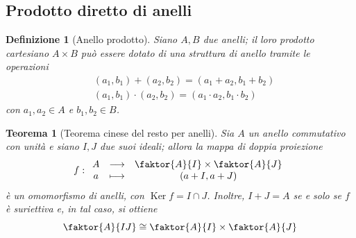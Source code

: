 \documentclass[12pt]{scrartcl}
\theoremstyle{style}
\newtheorem{definizione}{Definizione}[section]
\newtheorem{teorema}{Teorema}[section]
\numberwithin{equation}{subsection}
\begin{document}
\subsection{Prodotto diretto di anelli}
\begin{definizione}
	[Anello prodotto]
	Siano $A,B$ due anelli; il loro prodotto cartesiano $A\times B$ pu\`o essere dotato di una struttura di anello tramite le operazioni
	\[
	\begin{split}
		&(a_1,b_1)+(a_2,b_2) = (a_1+a_2,b_1+b_2) \\
		& (a_1,b_1) \cdot (a_2,b_2) = (a_1\cdot a_2, b_1\cdot b_2)
	\end{split}
	\] 
	con $a_1,a_2\in A$ e $b_1,b_2 \in B$.
\end{definizione}
\begin{teorema}
	[Teorema cinese del resto per anelli]
	Sia $A$ un anello commutativo con unit\`a e siano $I,J$ due suoi ideali; allora la mappa di doppia proiezione
	\[
	f :
	\begin{array}
		{c c c}
		A&\longrightarrow & \faktor{A}{I} \times \faktor{A}{J}\\
		a&\longmapsto &(a+I,a+J)
	\end{array}
	\] 
	\`e un omomorfismo di anelli, con $\operatorname{Ker} f = I\cap J$.
	Inoltre, $I+J = A$ se e solo se $f$ \`e suriettiva e, in tal caso, si ottiene
	\[
		\faktor{A}{IJ} \cong \faktor{A}{I} \times \faktor{A}{J}
	\] 
\end{teorema}
\end{document}
